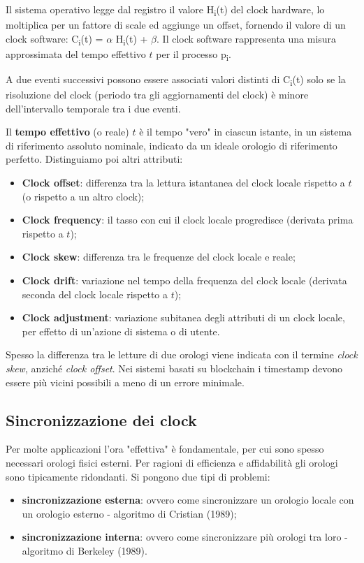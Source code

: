 Il sistema operativo legge dal registro il valore H\textsubscript{i}(t) del clock hardware, lo moltiplica per un fattore di scale ed aggiunge un offset, fornendo il valore di un clock software: C\textsubscript{i}(t) = $\alpha$ H\textsubscript{i}(t) + $\beta$. Il clock software rappresenta una misura approssimata del tempo effettivo $t$ per il processo p\textsubscript{i}.

A due eventi successivi possono essere associati valori distinti di C\textsubscript{i}(t) solo se la risoluzione del clock (periodo tra gli aggiornamenti del clock) è minore dell'intervallo temporale tra i due eventi.

\vspace{5mm}

Il \textbf{tempo effettivo} (o reale) $t$ è il tempo "vero" in ciascun istante, in un sistema di riferimento assoluto nominale, indicato da un ideale orologio di riferimento perfetto. Distinguiamo poi altri attributi:
\begin{itemize}
    \item \textbf{Clock offset}: differenza tra la lettura istantanea del clock locale rispetto a $t$ (o rispetto a un altro clock);
    \item \textbf{Clock frequency}: il tasso con cui il clock locale progredisce (derivata prima rispetto a $t$);
    \item \textbf{Clock skew}: differenza tra le frequenze del clock locale e reale;
    \item \textbf{Clock drift}: variazione nel tempo della frequenza del clock locale (derivata seconda del clock locale rispetto a $t$);
    \item \textbf{Clock adjustment}: variazione subitanea degli attributi di un clock locale, per effetto di un'azione di sistema o di utente.
\end{itemize}
Spesso la differenza tra le letture di due orologi viene indicata con il termine \textit{clock skew}, anziché \textit{clock offset}. Nei sistemi basati su blockchain i timestamp devono essere più vicini possibili a meno di un errore minimale.

\subsection{Sincronizzazione dei clock}
Per molte applicazioni l'ora "effettiva" è fondamentale, per cui sono spesso necessari orologi fisici esterni. Per ragioni di efficienza e affidabilità gli orologi sono tipicamente ridondanti. Si pongono due tipi di problemi:
\begin{itemize}
    \item \textbf{sincronizzazione esterna}: ovvero come sincronizzare un orologio locale con un orologio esterno - algoritmo di Cristian (1989);
    \item \textbf{sincronizzazione interna}: ovvero come sincronizzare più orologi tra loro - algoritmo di Berkeley (1989).
\end{itemize}

